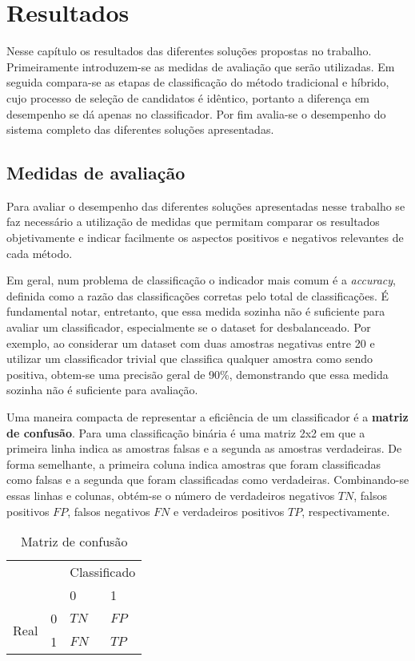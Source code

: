 \chapter{Resultados}
Nesse capítulo os resultados das diferentes soluções propostas no trabalho. Primeiramente introduzem-se as medidas de avaliação que serão utilizadas. Em seguida compara-se as etapas de classificação do método tradicional e híbrido, cujo processo de seleção de candidatos é idêntico, portanto a diferença em desempenho se dá apenas no classificador. Por fim avalia-se o desempenho do sistema completo das diferentes soluções apresentadas.

\section{Medidas de avaliação}
Para avaliar o desempenho das diferentes soluções apresentadas nesse trabalho se faz necessário a utilização de medidas que permitam comparar os resultados objetivamente e indicar facilmente os aspectos positivos e negativos relevantes de cada método. 

Em geral, num problema de classificação o indicador mais comum é a \textit{accuracy}, definida como a razão das classificações corretas pelo total de classificações. É fundamental notar, entretanto, que essa medida sozinha não é suficiente para avaliar um classificador, especialmente se o dataset for desbalanceado. Por exemplo, ao considerar um dataset com duas amostras negativas entre 20 e utilizar um classificador trivial que classifica qualquer amostra como sendo positiva, obtem-se uma precisão geral de 90\%, demonstrando que essa medida sozinha não é suficiente para avaliação.

Uma maneira compacta de representar a eficiência de um classificador é a \textbf{matriz de confusão}. Para uma classificação binária é uma matriz 2x2 em que a primeira linha indica as amostras falsas e a segunda as amostras verdadeiras. De forma semelhante, a primeira coluna indica amostras que foram classificadas como falsas e a segunda que foram classificadas como verdadeiras. Combinando-se essas linhas e colunas, obtém-se o número de verdadeiros negativos $TN$, falsos positivos $FP$, falsos negativos $FN$ e verdadeiros positivos $TP$, respectivamente.

\begin{table}[h]
\centering
\caption{Matriz de confusão}
\label{tab:matriz-confusão}
\begin{tabular}{ll|l|l|}
\cline{3-4}
                                            &   & \multicolumn{2}{l|}{Classificado} \\ \cline{3-4} 
                                            &   & 0               & 1               \\ \hline
\multicolumn{1}{|l|}{\multirow{2}{*}{Real}} & 0 & $TN$              & $FP$              \\ \cline{2-4} 
\multicolumn{1}{|l|}{}                      & 1 & $FN$              & $TP$              \\ \hline
\end{tabular}
\end{table}

